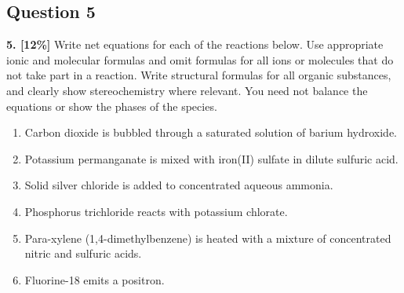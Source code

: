\documentclass[10pt,a4paper]{article}
\begin{document}
\subsection*{Question 5}
\textbf{5. [12\%]} Write net equations for each of the reactions below. Use appropriate ionic and molecular formulas and omit formulas for all ions or molecules that do not take part in a reaction. Write structural formulas for all organic substances, and clearly show stereochemistry where relevant. You need not balance the equations or show the phases of the species.
\begin{enumerate}[label=\alph*.]
    \vspace{5cm} \item Carbon dioxide is bubbled through a saturated solution of barium hydroxide.
    \vspace{5cm} \item Potassium permanganate is mixed with iron(II) sulfate in dilute sulfuric acid.
    \vspace{5cm} \item Solid silver chloride is added to concentrated aqueous ammonia.
    \vspace{5cm} \item Phosphorus trichloride reacts with potassium chlorate.
    \vspace{5cm} \item Para-xylene (1,4-dimethylbenzene) is heated with a mixture of concentrated nitric and sulfuric acids.
    \vspace{5cm} \item Fluorine-18 emits a positron.
\end{enumerate}
\end{document}

